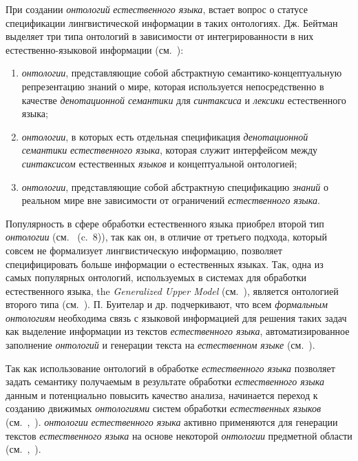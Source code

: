 При создании \textit{онтологий} \textit{естественного языка}, встает вопрос о статусе спецификации лингвистической информации в таких онтологиях.
Дж. Бейтман выделяет три типа онтологий в зависимости от интегрированности в них естественно-языковой информации (см.~):
\begin{enumerate}
    \item \textit{онтологии}, представляющие собой абстрактную семантико-концептуальную репрезентацию знаний о мире, которая используется непосредственно в качестве \textit{денотационной семантики} для \textit{синтаксиса} и \textit{лексики} естественного языка;
    \item \textit{онтологии}, в которых есть отдельная спецификация \textit{денотационной семантики} \textit{естественного языка}, которая служит интерфейсом между \textit{синтаксисом} естественных \textit{языков} и концептуальной онтологией;
    \item \textit{онтологии}, представляющие собой абстрактную спецификацию \textit{знаний} о реальном мире вне зависимости от ограничений \textit{естественного языка}.
\end{enumerate}

Популярность в сфере обработки естественного языка приобрел второй тип \textit{онтологии} (см.~ (c.~8)), так как он, в отличие от третьего подхода, который совсем не формализует лингвистическую информацию, позволяет специфицировать больше информации о естественных языках.
Так, одна из самых популярных онтологий, используемых в системах для обработки естественного языка, the \textit{Generalized Upper Model} (см.~), является онтологией второго типа (см.~).
П. Буителар и др. подчеркивают, что всем \textit{формальным онтологиям} необходима связь с языковой информацией для решения таких задач как выделение информации из текстов \textit{естественного языка}, автоматизированное заполнение \textit{онтологий} и генерации текста на \textit{естественном языке} (см.~).

Так как использование онтологий в обработке \textit{естественного языка} позволяет задать семантику получаемым в результате обработки \textit{естественного языка} данным и потенциально повысить качество анализа, начинается переход к созданию движимых \textit{онтологиями} систем обработки \textit{естественных языков} (см.~,~).
    \textit{онтологии} \textit{естественного языка} активно применяются для генерации текстов \textit{естественного языка} на основе некоторой \textit{онтологии} предметной области (см.~,~).

